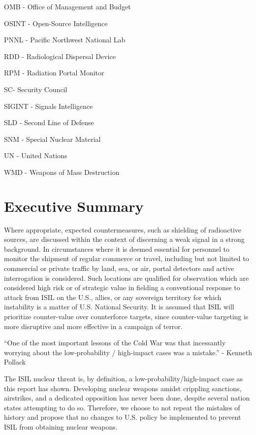 \documentclass{report}
\begin{document}
OMB - Office of Management and Budget

OSINT - Open-Source Intelligence

PNNL - Pacific Northwest National Lab

RDD - Radiological Dispersal Device

RPM - Radiation Portal Monitor

SC- Security Council

SIGINT - Signals Intelligence 

SLD - Second Line of Defense

SNM - Special Nuclear Material

UN - United Nations

WMD - Weapons of Mass Destruction

\newpage

\pagestyle{fancy2}


\chapter{Executive Summary}

Where appropriate, expected countermeasures, such as shielding of radioactive sources, are discussed within the context of discerning a weak signal in a strong background. In circumstances where it is deemed essential for personnel to monitor the shipment of regular commerce or travel, including but not limited to commercial or private traffic by land, sea, or air, portal detectors and active interrogation is considered. Such locations are qualified for observation which are considered high risk or of strategic value in fielding a conventional response to attack from ISIL on the U.S., allies, or any sovereign territory for which instability is a matter of U.S. National Security. It is assumed that ISIL will prioritize counter-value over counterforce targets, since counter-value targeting is more disruptive and more effective in a campaign of terror.


\enquote{One of the most important lessons of the Cold War was that incessantly worrying about the low-probability / high-impact cases was a mistake.}  - Kenneth Pollack \cite{pollack2014unthinkable}

The ISIL nuclear threat is, by definition, a low-probability/high-impact case as this report has shown.  Developing nuclear weapons amidst crippling sanctions, airstrikes, and a dedicated opposition has never been done, despite several nation states attempting to do so.  Therefore, we choose to not repeat the mistakes of history and propose that no changes to U.S. policy be implemented to prevent ISIL from obtaining nuclear weapons.
\end{document}
